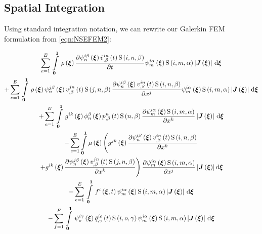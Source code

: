 \subsection{Spatial Integration}

Using standard integration notation, we can rewrite our Galerkin FEM
formulation from \ref{eqn:NSEFEM2}:

\begin{multline}
  \gsum{e=1}{E}{\gint{\vectr{0}}{\vectr{1}}{\fnof{\rho}{\vectr{\xi}}\delby{\idxgbfn{i}{n}{\beta}{\vectr{\xi}}
  \fnof{\idxnodedof{\dot{v}}{i}{n}{\beta}}{t}\idxgsf{i}{n}{\beta}}{t}\idxgbfn{i}{m}{\alpha}{\vectr{\xi}}\idxgsf{i}{m}{\alpha}\abs{\fnof{\matr{J}}{\vectr{\xi}}}}{\vectr{\xi}}}\\
  +\gsum{e=1}{E}{\gint{\vectr{0}}{\vectr{1}}{\fnof{\rho}{\vectr{\xi}}\idxgbfn{j}{n}{\beta}{\vectr{\xi}}
  \fnof{\idxnodedof{v}{j}{n}{\beta}}{t}\idxgsf{j}{n}{\beta}\delby{\idxgbfn{i}{n}{\beta}{\vectr{\xi}}
  \fnof{\idxnodedof{v}{i}{n}{\beta}}{t}\idxgsf{i}{n}{\beta}}{x^{j}}\idxgbfn{i}{m}{\alpha}{\vectr{\xi}}\idxgsf{i}{m}{\alpha}\abs{\fnof{\matr{J}}{\vectr{\xi}}}}{\vectr{\xi}}}\\
  +\gsum{e=1}{E}{\gint{\vectr{0}}{\vectr{1}}{\fnof{g^{ik}}{\vectr{\xi}}\altgbfn{n}{\beta}{\vectr{\xi}}
  \fnof{\nodedof{p}{n}{\beta}}{t}\gsf{n}{\beta}\delby{\idxgbfn{i}{m}{\alpha}{\vectr{\xi}}\idxgsf{i}{m}{\alpha}}{x^{k}}\abs{\fnof{\matr{J}}{\vectr{\xi}}}}{\vectr{\xi}}}\\
  -\dsuml{e=1}{E}\dintl{\vectr{0}}{\vectr{1}}\fnof{\mu}{\vectr{\xi}}\left(\fnof{g^{jk}}{\vectr{\xi}}\delby{\idxgbfn{i}{n}{\beta}{\vectr{\xi}}
      \fnof{\idxnodedof{v}{i}{n}{\beta}}{t}\idxgsf{i}{n}{\beta}}{x^{k}}\right.\\
    \left.+\fnof{g^{ik}}{\vectr{\xi}}\delby{\idxgbfn{j}{n}{\beta}{\vectr{\xi}}
  \fnof{\idxnodedof{v}{j}{n}{\beta}}{t}\idxgsf{j}{n}{\beta}}{x^{k}}\right)\delby{\idxgbfn{i}{m}{\alpha}{\vectr{\xi}}\idxgsf{i}{m}{\alpha}}{x^{j}}\abs{\fnof{\matr{J}}{\vectr{\xi}}}\exteriorderiv{\vectr{\xi}} \\
  -\gsum{e=1}{E}{\gint{\vectr{0}}{\vectr{1}}{\fnof{f^{i}}{\vectr{\xi},t}\idxgbfn{i}{m}{\alpha}{\vectr{\xi}}\idxgsf{i}{m}{\alpha}\abs{\fnof{\matr{J}}{\vectr{\xi}}}}{\vectr{\xi}}}\\
  -\gsum{f=1}{F}{\gint{\vectr{0}}{\vectr{1}}{\idxgbfn{i}{o}{\gamma}{\vectr{\xi}}
      \fnof{\idxnodedof{\bar{q}}{i}{o}{\gamma}}{t}\idxgsf{i}{o}{\gamma}\idxgbfn{i}{m}{\alpha}{\vectr{\xi}}\idxgsf{i}{m}{\alpha}\abs{\fnof{\matr{J}}{\vectr{\xi}}}}{\vectr{\xi}}}\\

\end{multline}
